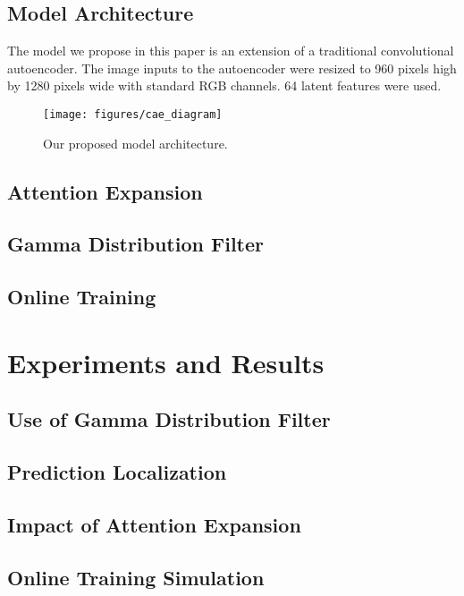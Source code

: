 \documentclass[12pt]{article}
\begin{document}
\subsection{Model Architecture}

The model we propose in this paper is an extension of a traditional convolutional autoencoder. The image inputs to the autoencoder were resized to 960 pixels high by 1280 pixels wide with standard RGB channels. 64 latent features were used.

\begin{figure}[H]
\texttt{[image: figures/cae\_diagram]}
\caption{Our proposed model architecture.}
\label{fig:cae_diagram}
\end{figure}


\subsection{Attention Expansion}

\subsection{Gamma Distribution Filter}

\subsection{Online Training}
\section{Experiments and Results}

\subsection{Use of Gamma Distribution Filter}

\subsection{Prediction Localization}

\subsection{Impact of Attention Expansion}

\subsection{Online Training Simulation}
\end{document}
